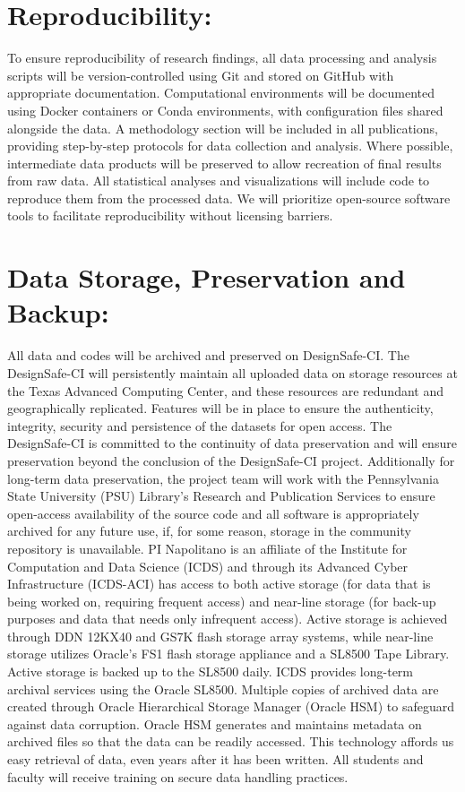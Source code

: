 \documentclass[11pt]{article}
\begin{document}
\section{Reproducibility:} To ensure reproducibility of research findings, all data processing and analysis scripts will be version-controlled using Git and stored on GitHub with appropriate documentation. Computational environments will be documented using Docker containers or Conda environments, with configuration files shared alongside the data. A methodology section will be included in all publications, providing step-by-step protocols for data collection and analysis. Where possible, intermediate data products will be preserved to allow recreation of final results from raw data. All statistical analyses and visualizations will include code to reproduce them from the processed data. We will prioritize open-source software tools to facilitate reproducibility without licensing barriers.

\section{Data Storage, Preservation and Backup:} 
All data and codes will be archived and preserved on DesignSafe-CI. 
The DesignSafe-CI will persistently maintain all uploaded data on storage resources at the Texas Advanced Computing Center, and these resources are redundant and geographically replicated.
Features will be in place to ensure the authenticity, integrity, security and persistence of the datasets for open access. 
The DesignSafe-CI is committed to the continuity of data preservation and will ensure preservation beyond the conclusion of the DesignSafe-CI project. 
Additionally for long-term data preservation, the project team will work with the Pennsylvania State University (PSU) Library’s Research and Publication Services to ensure open-access availability of the source code and all software is appropriately archived for any future use, if, for some reason, storage in the community repository is unavailable. 
PI Napolitano is an affiliate of the Institute for Computation and Data Science (ICDS) and through its Advanced Cyber Infrastructure (ICDS-ACI) has access to both active storage (for data that is being worked on, requiring frequent access) and near-line storage (for back-up purposes and data that needs only infrequent access). 
Active storage is achieved through DDN 12KX40 and GS7K flash storage array systems, while near-line storage utilizes Oracle’s FS1 flash storage appliance and a SL8500 Tape Library. 
Active storage is backed up to the SL8500 daily. 
ICDS provides long-term archival services using the Oracle SL8500. 
Multiple copies of archived data are created through Oracle Hierarchical Storage Manager (Oracle HSM) to safeguard against data corruption. 
Oracle HSM generates and maintains metadata on archived files so that the data can be readily accessed. This technology affords us easy retrieval of data, even years after it has been written. 
All students and faculty will receive training on secure data handling practices. 
\end{document}
